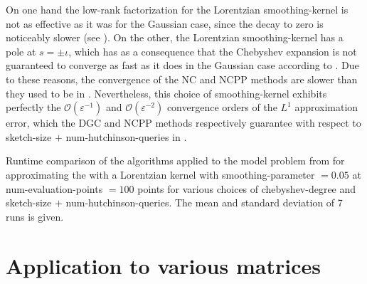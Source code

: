 On one hand the low-rank factorization for the Lorentzian \gls{smoothing-kernel}
is not as effective as it was for the Gaussian case, since the decay to zero
is noticeably slower (see ). On the
other, the Lorentzian \gls{smoothing-kernel} has a pole at $s = \pm \iota$, which
has as a consequence that the Chebyshev expansion is not guaranteed to converge
as fast as it does in the Gaussian case according to .
Due to these reasons, the convergence of the \gls{NC} and \gls{NCPP} methods
are slower than they used to be in .
Nevertheless, this choice of \gls{smoothing-kernel} exhibits perfectly the 
$\mathcal{O}(\varepsilon^{-1})$ and $\mathcal{O}(\varepsilon^{-2})$ convergence
orders of the $L^1$ approximation error, which the \gls{DGC} and \gls{NCPP}
methods respectively guarantee with respect to
\gls{sketch-size} $+$ \gls{num-hutchinson-queries} in .\\

\begin{table}[ht]
    \caption{Runtime comparison of the algorithms applied to the model problem
    from 
    for approximating the  with a Lorentzian kernel with
    \gls{smoothing-parameter} $=0.05$ at \gls{num-evaluation-points} $=100$
    points for various choices of \gls{chebyshev-degree} and \gls{sketch-size} $+$ \gls{num-hutchinson-queries}.
    The mean and standard deviation of 7 runs is given.}
    \label{tab:5-experiments-timing-haydock}
   
\end{table}


\clearpage
\section{Application to various matrices}
\label{sec:5-experiments-various-matrices}

